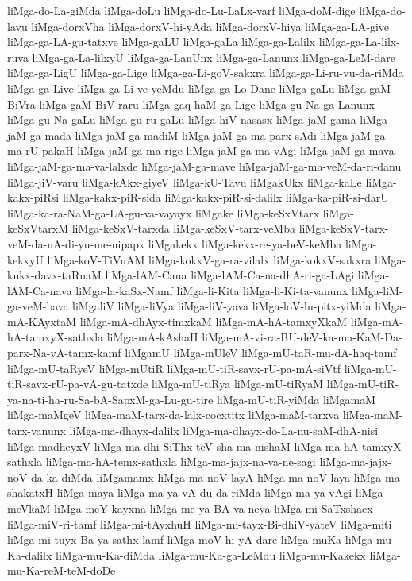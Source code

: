 {liMga-do-La-giMda
liMga-doLu
liMga-do-Lu-LaLx-varf
liMga-doM-dige
liMga-do-lavu
liMga-dorxVha
liMga-dorxV-hi-yAda
liMga-dorxV-hiya
liMga-ga-LA-give
liMga-ga-LA-gu-tatxve
liMga-gaLU
liMga-gaLa
liMga-ga-Lalilx
liMga-ga-La-lilx-ruva
liMga-ga-La-lilxyU
liMga-ga-LanUnx
liMga-ga-Lanunx
liMga-ga-LeM-dare
liMga-ga-LigU
liMga-ga-Lige
liMga-ga-Li-goV-sakxra
liMga-ga-Li-ru-vu-da-riMda
liMga-ga-Live
liMga-ga-Li-ve-yeMdu
liMga-ga-Lo-Dane
liMga-gaLu
liMga-gaM-BiVra
liMga-gaM-BiV-raru
liMga-gaq-haM-ga-Lige
liMga-gu-Na-ga-Lanunx
liMga-gu-Na-gaLu
liMga-gu-ru-gaLu
liMga-hiV-nasasx
liMga-jaM-gama
liMga-jaM-ga-mada
liMga-jaM-ga-madiM
liMga-jaM-ga-ma-parx-sAdi
liMga-jaM-ga-ma-rU-pakaH
liMga-jaM-ga-ma-rige
liMga-jaM-ga-ma-vAgi
liMga-jaM-ga-mava
liMga-jaM-ga-ma-va-lalxde
liMga-jaM-ga-mave
liMga-jaM-ga-ma-veM-da-ri-danu
liMga-jiV-varu
liMga-kAkx-giyeV
liMga-kU-Tavu
liMgakUkx
liMga-kaLe
liMga-kakx-piRsi
liMga-kakx-piR-sida
liMga-kakx-piR-si-dalilx
liMga-ka-piR-si-darU
liMga-ka-ra-NaM-ga-LA-gu-va-vayayx
liMgake
liMga-keSxVtarx
liMga-keSxVtarxM
liMga-keSxV-tarxda
liMga-keSxV-tarx-veMba
liMga-keSxV-tarx-veM-da-nA-di-yu-me-nipapx
liMgakekx
liMga-kekx-re-ya-beV-keMba
liMga-kekxyU
liMga-koV-TiVnAM
liMga-kokxV-ga-ra-vilalx
liMga-kokxV-sakxra
liMga-kukx-davx-taRnaM
liMga-lAM-Cana
liMga-lAM-Ca-na-dhA-ri-ga-LAgi
liMga-lAM-Ca-nava
liMga-la-kaSx-Namf
liMga-li-Kita
liMga-li-Ki-ta-vanunx
liMga-liM-ga-veM-bava
liMgaliV
liMga-liVya
liMga-liV-yava
liMga-loV-lu-pitx-yiMda
liMga-mA-KAyxtaM
liMga-mA-dhAyx-timxkaM
liMga-mA-hA-tamxyXkaM
liMga-mA-hA-tamxyX-sathxla
liMga-mA-kAshaH
liMga-mA-vi-ra-BU-deV-ka-ma-KaM-Da-parx-Na-vA-tamx-kamf
liMgamU
liMga-mUleV
liMga-mU-taR-mu-dA-haq-tamf
liMga-mU-taRyeV
liMga-mUtiR
liMga-mU-tiR-savx-rU-pa-mA-siVtf
liMga-mU-tiR-savx-rU-pa-vA-gu-tatxde
liMga-mU-tiRya
liMga-mU-tiRyaM
liMga-mU-tiR-ya-na-ti-ha-ru-Sa-bA-SapxM-ga-Lu-gu-tire
liMga-mU-tiR-yiMda
liMgamaM
liMga-maMgeV
liMga-maM-tarx-da-lalx-cocxtitx
liMga-maM-tarxva
liMga-maM-tarx-vanunx
liMga-ma-dhayx-dalilx
liMga-ma-dhayx-do-La-nu-saM-dhA-nisi
liMga-madheyxV
liMga-ma-dhi-SiThx-teV-sha-ma-nishaM
liMga-ma-hA-tamxyX-sathxla
liMga-ma-hA-temx-sathxla
liMga-ma-jajx-na-va-ne-sagi
liMga-ma-jajx-noV-da-ka-diMda
liMgamamx
liMga-ma-noV-layA
liMga-ma-noV-laya
liMga-ma-shakatxH
liMga-maya
liMga-ma-ya-vA-du-da-riMda
liMga-ma-ya-vAgi
liMga-meVkaM
liMga-meY-kayxna
liMga-me-ya-BA-va-neya
liMga-mi-SaTxshacx
liMga-miV-ri-tamf
liMga-mi-tAyxhuH
liMga-mi-tayx-Bi-dhiV-yateV
liMga-miti
liMga-mi-tuyx-Ba-ya-sathx-lamf
liMga-moV-hi-yA-dare
liMga-muKa
liMga-mu-Ka-dalilx
liMga-mu-Ka-diMda
liMga-mu-Ka-ga-LeMdu
liMga-mu-Kakekx
liMga-mu-Ka-reM-teM-doDe
}
